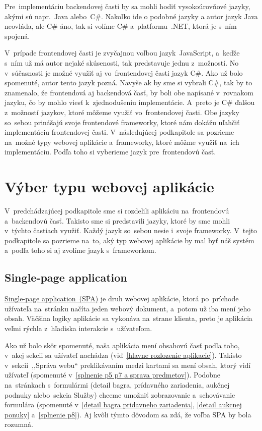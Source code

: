 Pre~implementáciu backendovej časti by sa mohli hodiť vysokoúrovňové jazyky, akými sú napr.~Java alebo~C\#. Nakoľko ide o podobné jazyky a autor jazyk Java neovláda, ale C\# áno, tak si volíme C\# a~platformu~.NET, ktorá je s~ním spojená.

V~prípade frontendovej časti je zvyčajnou voľbou jazyk~JavaScript, a~keďže s~ním už má autor nejaké skúsenosti, tak predstavuje jednu z~možností. No v~súčasnosti je možné využiť aj vo~frontendovej časti jazyk C\#. Ako už bolo spomenuté, autor tento jazyk pozná. Navyše ak by sme si vybrali C\#, tak by to znamenalo, že frontendová aj backendová časť, by boli obe napísané v~rovnakom jazyku, čo by mohlo viesť k~zjednodušeniu implementácie. A~preto je C\# ďalšou z~možností jazykov, ktoré môžeme využiť vo~frontendovej časti. Obe jazyky so~sebou prinášajú svoje frontendové frameworky, ktoré nám dokážu uľahčiť implementáciu frontendovej časti. V~následujúcej podkapitole sa pozrieme na~možné typy webovej aplikácie a~frameworky, ktoré môžme využiť na~ich implementáciu. Podľa toho si vyberieme jazyk pre~frontendovú časť.

\section{Výber typu webovej aplikácie}
\label{vyber typu webovej aplikacie}

V~predchádzajúcej podkapitole sme si rozdelili aplikáciu na~frontendovú a~backendovú časť. Takisto sme si predstavili jazyky, ktoré by sme mohli v~týchto častiach využiť. Každý jazyk so~sebou nesie i~svoje frameworky. V~tejto podkapitole sa pozrieme na~to, aký typ webovej aplikácie by mal byť náš systém a~podľa toho si aj zvolíme jazyk s~frameworkom.

\subsection{Single-page application}
\label{single page application}

\href{https://developer.mozilla.org/en-US/docs/Glossary/SPA}{Single-page application~(SPA)} je druh webovej aplikácie, ktorá po~príchode užívateľa na~stránku načíta jeden webový dokument, a~potom už iba mení jeho obsah. Väčšina logiky aplikácie sa vykonáva na~strane klienta, preto je aplikácia veľmi rýchla z~hľadiska interakcie s~užívateľom.

Ako už bolo skôr spomenuté, naša aplikácia mení obsahovú časť podľa toho, v~akej sekcii sa užívateľ nachádza (viď~\ref{hlavne rozlozenie aplikacie}). Takisto v~sekcii~,,Správa webu`` preklikávaním medzi kartami sa mení obsah, ktorý vidí užívateľ (spomenuté v~\ref{splnenie p5 p7 a sprava predmetov}). Podobne na~stránkach s~formulármi (detail bagra, prídavného zariadenia, aukčnej podnuky alebo~sekcia Služby) chceme umožniť zobrazovanie a~schovávanie formulára (spomenuté v~\ref{detail bagra pridavneho zariadenia}, \ref{detail aukcnej ponuky} a~\ref{splnenie p8}). Aj kvôli týmto dôvodom sa zdá, že voľba SPA by bola rozumná.

